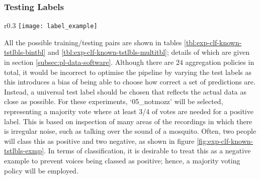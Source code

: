        \subsubsection{Testing Labels}
        \label{subsubsec:exp-clf-known-tstlbls}
            \begin{wrapfigure}{r}{0.3\textwidth}
                \centering
                \texttt{[image: label\_example]}
                \caption{An example of noise where there is $50/50$ disagreement between labellers.}
                \label{fig:exp-clf-known-tstlbls-exmp}
            \end{wrapfigure}
            All the possible training/testing pairs are shown in tables \ref{tbl:exp-clf-known-tstlbls-bintbl} and \ref{tbl:exp-clf-known-tstlbls-multitbl}; details of which are given in section \ref{subsec:pl-data-software}. Although there are $24$ aggregation policies in total, it would be incorrect to optimise the pipeline by varying the test labels as this introduces a bias of being able to choose how correct a set of predictions are. Instead, a universal test label should be chosen that reflects the actual data as close as possible. For these experiments, `05\_notmozz' will be selected, representing a majority vote where at least 3/4 of votes are needed for a positive label. This is based on inspection of many areas of the recordings in which there is irregular noise, such as talking over the sound of a mosquito. Often, two people will class this as positive and two negative, as shown in figure \ref{fig:exp-clf-known-tstlbls-exmp}. In terms of classification, it is desirable to treat this as a negative example to prevent voices being classed as positive; hence, a majority voting policy will be employed.

